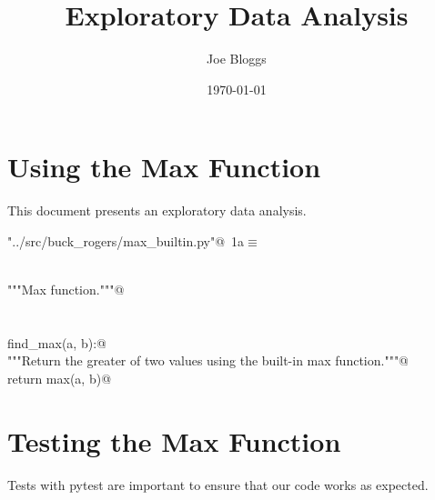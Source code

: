 \documentclass[a4paper,11pt]{article}
\title{Exploratory Data Analysis}
\date{\today}
\begin{document}
\author{Joe Bloggs}
\maketitle{}

\section{Using the Max Function}

This document presents an exploratory data analysis.


\begin{flushleft} \small
\begin{minipage}{\linewidth}\label{scrap1}\raggedright\small
{} \verb@"../src/buck_rogers/max_builtin.py"@\nobreak\ {\footnotesize {1a}}$\equiv$
\vspace{-1ex}
\begin{list}{}{} \item
\mbox{}\lstinline@@\\
\mbox{}\lstinline@"""Max function."""@\\
\mbox{}\lstinline@@\\
\mbox{}\lstinline@@\\
\mbox{}\lstinline@def find_max(a, b):@\\
\mbox{}\lstinline@    """Return the greater of two values using the built-in max function."""@\\
\mbox{}\lstinline@    return max(a, b)@\\
\mbox{}\lstinline@@{\NWsep}
\end{list}
\vspace{-1.5ex}
\footnotesize
\begin{list}{}{\setlength{\itemsep}{-\parsep}\setlength{\itemindent}{-\leftmargin}}

\item{}
\end{list}
\end{minipage}\vspace{4ex}
\end{flushleft}
\section{Testing the Max Function}

Tests with pytest are important to ensure that our code works as expected.
\end{document}
